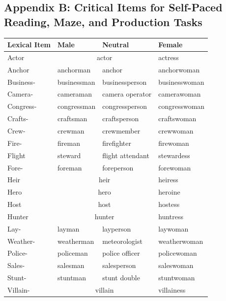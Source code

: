 \documentclass{article}
\begin{document}
		\subsection*{Appendix B: Critical Items for Self-Paced Reading, Maze, and Production Tasks}
		
	
	\begin{table}[h!]
		\centering
		\begin{tabular}{|l|l|l|l|}
			\hline
			\textbf{Lexical Item} & \textbf{Male} & \textbf{Neutral} & \textbf{Female} \\
			\hline
			Actor & \multicolumn{2}{c|}{actor} & actress \\
			\hline
			Anchor & anchorman & anchor & anchorwoman \\
			\hline
			Business- & businessman & businessperson & businesswoman \\
			\hline
			Camera- & cameraman & camera operator & camerawoman \\
			\hline
			Congress- & congressman & congressperson & congresswoman \\
			\hline 
			Crafts- & craftsman & craftsperson & craftswoman \\
			\hline 
			Crew- & crewman & crewmember & crewwoman \\
			\hline
			Fire- & fireman & firefighter & firewoman \\
			\hline
			Flight & steward & flight attendant & stewardess \\
			\hline
			Fore- & foreman & foreperson & forewoman \\
			\hline
			Heir & \multicolumn{2}{c|}{heir} & heiress \\
			\hline 
			Hero & \multicolumn{2}{c|}{hero} & heroine \\
			\hline
			Host & \multicolumn{2}{c|}{host} & hostess \\
			\hline
			Hunter & \multicolumn{2}{c|}{hunter} & huntress \\
			\hline
			Lay- & layman & layperson & laywoman \\
			\hline
			Weather- & weatherman & meteorologist & weatherwoman \\
			\hline 
			Police- & policeman & police officer & policewoman \\
			\hline
			Sales- & salesman & salesperson & saleswoman \\
			\hline
			Stunt- & stuntman & stunt double & stuntwoman \\
			\hline 
			Villain- & \multicolumn{2}{c|}{villain} & villainess \\
			\hline
			
		\end{tabular}
	\end{table}
	
	
	\newpage
	\nocite{kelly2018}
	\printbibliography
	
\end{document}
